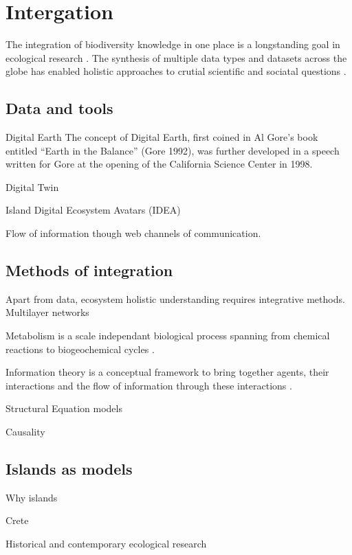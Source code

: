 \section{Intergation}
\label{sec:crete-integration}

The integration of biodiversity knowledge in one place is a longstanding
goal in ecological research \citep{Walter_2012}. The synthesis of multiple
data types and datasets across the globe has enabled 
holistic approaches to crutial scientific and sociatal questions \citep{heberling_j_mason_data_2021}.

\subsection{Data and tools}
\label{sec:data-tools}

Digital Earth
The concept of Digital Earth, first coined in Al Gore’s book entitled 
“Earth in the Balance” (Gore 1992), was further developed in a speech
written for Gore at the opening of the California Science Center in 1998.

Digital Twin

Island Digital Ecosystem Avatars (IDEA)

Flow of information though web channels of communication.

\subsection{Methods of integration}
\label{sec:meth-int}

Apart from data, ecosystem holistic understanding requires integrative methods.
Multilayer networks \citep{marine-multilayers}

Metabolism is a scale independant biological process spanning from chemical reactions
to biogeochemical cycles \citep{hall2018understanding}. 

Information theory is a conceptual framework to bring together agents,
their interactions and the flow of information through these interactions \citep{oconnor-information-ecology}.

Structural Equation models

Causality

\subsection{Islands as models}
\label{sec:island-model}

Why islands

Crete 

Historical and contemporary ecological research
